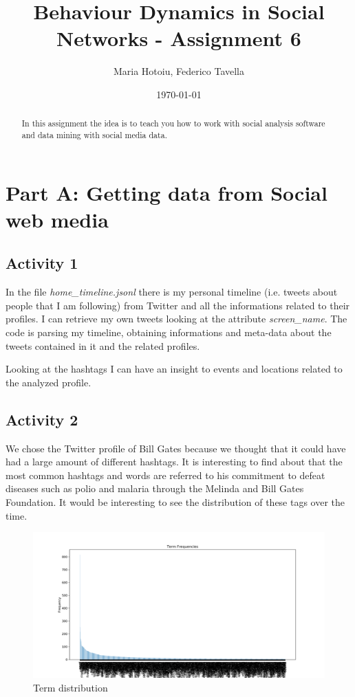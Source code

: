\documentclass[a4paper]{article}
\title{Behaviour Dynamics in Social Networks - Assignment 6}
\author{Maria Hotoiu, Federico Tavella}
\date{\today}
\begin{document}
\maketitle

\begin{abstract}
In this assignment the idea is to teach you how to work with social analysis software and data mining with social media data.
\end{abstract}

\section{Part A: Getting data from Social web media}

\subsection{Activity 1}

In the file \emph{home\_timeline.jsonl} there is my personal timeline (i.e. tweets about people that I am following) from Twitter and all the informations related to their profiles. I can retrieve my own tweets looking at the attribute \emph{screen\_name}. The code is parsing my timeline, obtaining informations and meta-data about the tweets contained in it and the related profiles.

Looking at the hashtags I can have an insight to events and locations related to the analyzed profile.

\subsection{Activity 2}

We chose the Twitter profile of Bill Gates because we thought that it could have had a large amount of different hashtags. It is interesting to find about that the  most common hashtags and words are referred to his commitment to defeat diseases such as polio and malaria through the Melinda and Bill Gates Foundation. It would be interesting to see the distribution of these tags over the time.

\begin{figure}[!htpb]
\centering
\includegraphics[width=\textwidth]{res/img/term_distribution}
\caption{Term distribution}
\end{figure}
\end{document}

